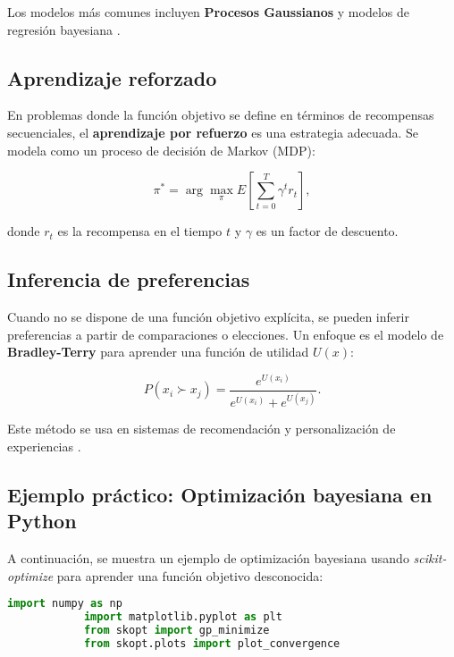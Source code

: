 \begin{itemize}
		Los modelos más comunes incluyen \textbf{Procesos Gaussianos} y modelos de regresión bayesiana \cite{frazier2018tutorial}.
		
		\subsection{Aprendizaje reforzado}
		
		En problemas donde la función objetivo se define en términos de recompensas secuenciales, el \textbf{aprendizaje por refuerzo} es una estrategia adecuada. Se modela como un proceso de decisión de Markov (MDP):
		
		\begin{equation}
			\pi^* = \arg \max_{\pi} E\left[ \sum_{t=0}^{T} \gamma^t r_t \right],
		\end{equation}
		
		donde \( r_t \) es la recompensa en el tiempo \( t \) y \( \gamma \) es un factor de descuento.
		
		\subsection{Inferencia de preferencias}
		
		Cuando no se dispone de una función objetivo explícita, se pueden inferir preferencias a partir de comparaciones o elecciones. Un enfoque es el modelo de \textbf{Bradley-Terry} para aprender una función de utilidad \( U(x) \):
		
		\begin{equation}
			P(x_i \succ x_j) = \frac{e^{U(x_i)}}{e^{U(x_i)} + e^{U(x_j)}}.
		\end{equation}
		
		Este método se usa en sistemas de recomendación y personalización de experiencias \cite{boutilier2006preference}.
		
		\subsection{Ejemplo práctico: Optimización bayesiana en Python}
		
		A continuación, se muestra un ejemplo de optimización bayesiana usando \textit{scikit-optimize} para aprender una función objetivo desconocida:
		
		\begin{lstlisting}[language=Python, caption={Optimización bayesiana en Python}]
			import numpy as np
			import matplotlib.pyplot as plt
			from skopt import gp_minimize
			from skopt.plots import plot_convergence
			

\end{lstlisting}
\end{itemize}
